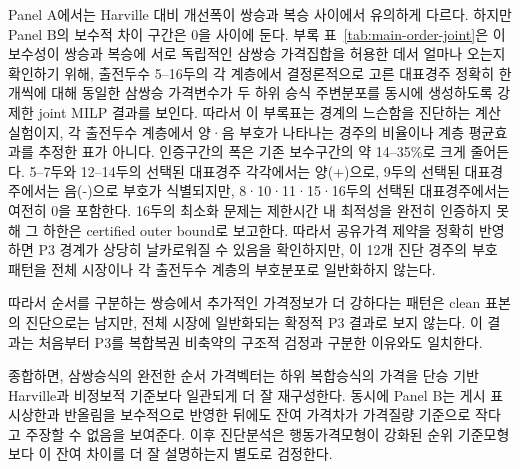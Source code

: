 Panel A에서는 Harville 대비 개선폭이 쌍승과 복승 사이에서 유의하게 다르다.
하지만 Panel B의 보수적 차이 구간은 0을 사이에 둔다. 부록
표~\ref{tab:main-order-joint}은
이 보수성이 쌍승과 복승에 서로 독립적인 삼쌍승 가격집합을 허용한 데서 얼마나
오는지 확인하기 위해, 출전두수 5--16두의 각 계층에서 결정론적으로 고른 대표경주
정확히 한 개씩에 대해 동일한 삼쌍승 가격변수가 두 하위 승식 주변분포를 동시에
생성하도록 강제한 joint MILP 결과를 보인다. 따라서 이 부록표는 경계의 느슨함을
진단하는 계산실험이지, 각 출전두수 계층에서 양·음 부호가 나타나는 경주의 비율이나
계층 평균효과를 추정한 표가 아니다. 인증구간의 폭은 기존 보수구간의 약
14--35\%로 크게 줄어든다. 5--7두와 12--14두의 선택된 대표경주 각각에서는
양(+)으로, 9두의 선택된 대표경주에서는 음(-)으로 부호가 식별되지만,
8·10·11·15·16두의 선택된 대표경주에서는 여전히 0을 포함한다. 16두의
최소화 문제는 제한시간 내 최적성을 완전히 인증하지 못해 그 하한은 certified
outer bound로 보고한다. 따라서 공유가격 제약을 정확히 반영하면 P3 경계가 상당히
날카로워질 수 있음을 확인하지만, 이 12개 진단 경주의 부호 패턴을 전체 시장이나
각 출전두수 계층의 부호분포로 일반화하지 않는다.

따라서 순서를 구분하는 쌍승에서 추가적인 가격정보가 더 강하다는 패턴은 clean
표본의 진단으로는 남지만, 전체 시장에 일반화되는 확정적 P3 결과로 보지 않는다.
이 결과는 처음부터 P3를 복합복권 비축약의 구조적 검정과 구분한 이유와도 일치한다.

종합하면, 삼쌍승식의 완전한 순서 가격벡터는 하위 복합승식의 가격을 단승 기반
Harville과 비정보적 기준보다 일관되게 더 잘 재구성한다. 동시에 Panel B는
게시 표시상한과 반올림을 보수적으로 반영한 뒤에도 잔여 가격차가 가격질량 기준으로 작다고
주장할 수 없음을 보여준다. 이후 진단분석은 행동가격모형이 강화된 순위
기준모형보다 이 잔여 차이를 더 잘 설명하는지 별도로 검정한다.
